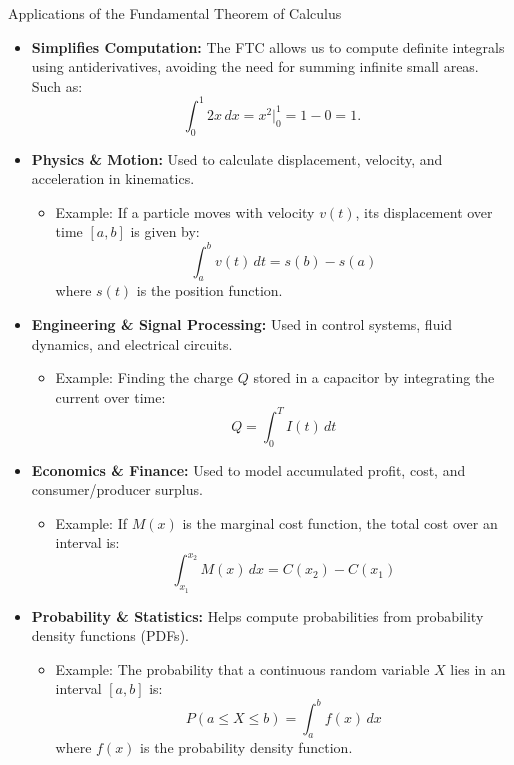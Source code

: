 \documentclass{beamer}
\begin{document}
\begin{frame}{Applications of the Fundamental Theorem of Calculus}

    \begin{itemize}
        \tiny
        \item \textbf{Simplifies Computation:} The FTC allows us to compute definite integrals using antiderivatives, avoiding the need for summing infinite small areas. Such as:
        \[
        \int_0^1 2x \, dx = x^2 \Big|_0^1 = 1 - 0 = 1.
        \]

        \item \textbf{Physics \& Motion:} Used to calculate displacement, velocity, and acceleration in kinematics.
        \begin{itemize}
            \tiny
            \item Example: If a particle moves with velocity \( v(t) \), its displacement over time \( [a, b] \) is given by:
            \[
            \int_a^b v(t) \, dt = s(b) - s(a)
            \]
            where \( s(t) \) is the position function.
        \end{itemize}
    
        \item \textbf{Engineering \& Signal Processing:} Used in control systems, fluid dynamics, and electrical circuits.
        \begin{itemize}
            \tiny
            \item Example: Finding the charge \( Q \) stored in a capacitor by integrating the current over time:
            \[
            Q = \int_0^T I(t) \, dt
            \]
        \end{itemize}
    
        \item \textbf{Economics \& Finance:} Used to model accumulated profit, cost, and consumer/producer surplus.
        \begin{itemize}
            \tiny
            \item Example: If \( M(x) \) is the marginal cost function, the total cost over an interval is:
            \[
            \int_{x_1}^{x_2} M(x) \, dx = C(x_2) - C(x_1)
            \]
        \end{itemize}
    
        \item \textbf{Probability \& Statistics:} Helps compute probabilities from probability density functions (PDFs).
        \begin{itemize}
            \tiny
            \item Example: The probability that a continuous random variable \( X \) lies in an interval \( [a, b] \) is:
            \[
            P(a \leq X \leq b) = \int_a^b f(x) \, dx
            \]
            where \( f(x) \) is the probability density function.
        \end{itemize}
    
    \end{itemize}
    
    \end{frame}
\end{document}
